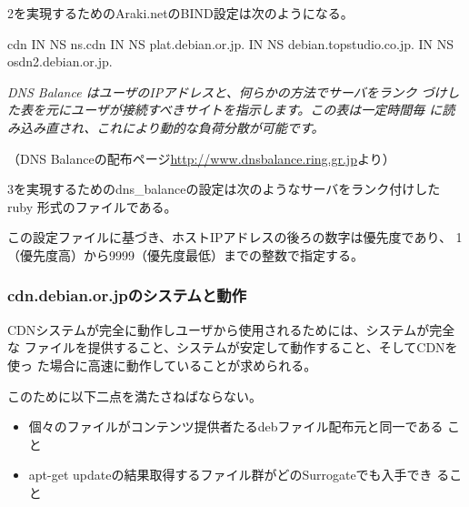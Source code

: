 \documentclass[mingoth,a4paper]{jsarticle}
\begin{document}
2を実現するためのAraki.netのBIND設定は次のようになる。

\begin{commandline}
cdn             IN      NS      ns.cdn
                IN      NS      plat.debian.or.jp.
                IN      NS      debian.topstudio.co.jp.
                IN      NS      osdn2.debian.or.jp.
\end{commandline}

\textit{DNS Balance はユーザのIPアドレスと、何らかの方法でサーバをランク
づけした表を元にユーザが接続すべきサイトを指示します。この表は一定時間毎
に読み込み直され、これにより動的な負荷分散が可能です。}

（DNS Balanceの配布ページ\url{http://www.dnsbalance.ring.gr.jp}より）

3を実現するためのdns\_balanceの設定は次のようなサーバをランク付けしたruby
形式のファイルである。


この設定ファイルに基づき、ホストIPアドレスの後ろの数字は優先度であり、
1（優先度高）から9999（優先度最低）までの整数で指定する。

\subsubsection{cdn.debian.or.jpのシステムと動作}

CDNシステムが完全に動作しユーザから使用されるためには、システムが完全な
ファイルを提供すること、システムが安定して動作すること、そしてCDNを使っ
た場合に高速に動作していることが求められる。


このために以下二点を満たさねばならない。

\begin{itemize}
 \item 個々のファイルがコンテンツ提供者たるdebファイル配布元と同一である
       こと
 \item apt-get updateの結果取得するファイル群がどのSurrogateでも入手でき
       ること
\end{itemize}
\end{document}
